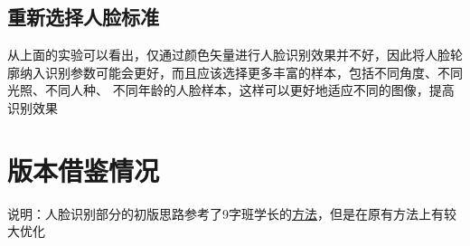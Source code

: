 \documentclass[12pt]{article}
\begin{document}
\subsection{重新选择人脸标准}

从上面的实验可以看出，仅通过颜色矢量进行人脸识别效果并不好，因此将人脸轮廓纳入识别参数可能会更好，而且应该选择更多丰富的样本，包括不同角度、不同光照、不同人种、
不同年龄的人脸样本，这样可以更好地适应不同的图像，提高识别效果

\section{版本借鉴情况}
说明：人脸识别部分的初版思路参考了9字班学长的\href{https://github.com/Timothy-Liuxf/THUEE_MATLAB/tree/master/image}{方法}，但是在原有方法上有较大优化\\
\end{document}
